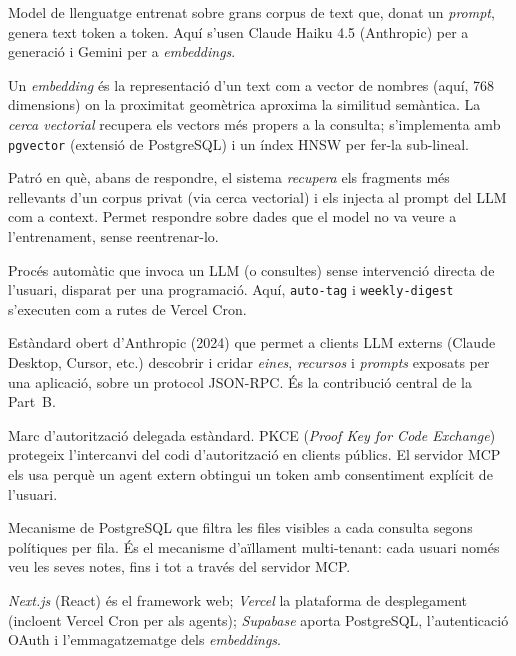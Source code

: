\begin{description}[style=nextline, leftmargin=0pt]
  \item[LLM (Large Language Model)] Model de llenguatge entrenat sobre
    grans corpus de text que, donat un \emph{prompt}, genera text token a
    token. Aquí s'usen Claude Haiku 4.5 (Anthropic) per a generació i
    Gemini per a \emph{embeddings}.

  \item[Embedding i cerca vectorial] Un \emph{embedding} és la
    representació d'un text com a vector de nombres (aquí, 768 dimensions)
    on la proximitat geomètrica aproxima la similitud semàntica. La
    \emph{cerca vectorial} recupera els vectors més propers a la consulta;
    s'implementa amb \texttt{pgvector} (extensió de PostgreSQL) i un índex
    HNSW per fer-la sub-lineal.

  \item[RAG (Retrieval-Augmented Generation)] Patró en què, abans de
    respondre, el sistema \emph{recupera} els fragments més rellevants
    d'un corpus privat (via cerca vectorial) i els injecta al prompt del
    LLM com a context. Permet respondre sobre dades que el model no va
    veure a l'entrenament, sense reentrenar-lo.

  \item[Agent en segon pla] Procés automàtic que invoca un LLM (o consultes)
    sense intervenció directa de l'usuari, disparat per una programació.
    Aquí, \texttt{auto-tag} i \texttt{weekly-digest} s'executen com a rutes
    de Vercel Cron.

  \item[MCP (Model Context Protocol)] Estàndard obert d'Anthropic (2024)
    que permet a clients LLM externs (Claude Desktop, Cursor, etc.)
    descobrir i cridar \emph{eines}, \emph{recursos} i \emph{prompts}
    exposats per una aplicació, sobre un protocol JSON-RPC. És la
    contribució central de la Part~B.

  \item[OAuth 2.1 i PKCE] Marc d'autorització delegada estàndard. PKCE
    (\emph{Proof Key for Code Exchange}) protegeix l'intercanvi del codi
    d'autorització en clients públics. El servidor MCP els usa perquè un
    agent extern obtingui un token amb consentiment explícit de l'usuari.

  \item[RLS (Row-Level Security)] Mecanisme de PostgreSQL que filtra les
    files visibles a cada consulta segons polítiques per fila. És el
    mecanisme d'aïllament multi-tenant: cada usuari només veu les seves
    notes, fins i tot a través del servidor MCP.

  \item[Vercel, Next.js i Supabase] \emph{Next.js} (React) és el framework
    web; \emph{Vercel} la plataforma de desplegament (incloent Vercel
    Cron per als agents); \emph{Supabase} aporta PostgreSQL, l'autenticació
    OAuth i l'emmagatzematge dels \emph{embeddings}.
\end{description}


